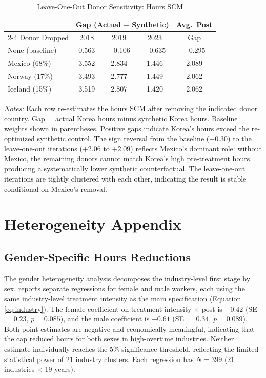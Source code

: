 \documentclass[12pt]{article}
\begin{document}
\begin{table}[H]
\centering
\caption{Leave-One-Out Donor Sensitivity: Hours SCM}
\label{tab:loo_donors}
\begin{tabular}{lcccc}
\toprule
 & \multicolumn{3}{c}{Gap (Actual $-$ Synthetic)} & Avg.\ Post \\
\cmidrule(lr){2-4}
Donor Dropped & 2018 & 2019 & 2023 & Gap \\
\midrule
None (baseline) & 0.563 & $-$0.106 & $-$0.635 & $-$0.295 \\
Mexico (68\%) & 3.552 & 2.834 & 1.446 & 2.089 \\
Norway (17\%) & 3.493 & 2.777 & 1.449 & 2.062 \\
Iceland (15\%) & 3.519 & 2.807 & 1.420 & 2.062 \\
\bottomrule
\end{tabular}
\begin{minipage}{0.95\textwidth}
\footnotesize\textit{Notes:} Each row re-estimates the hours SCM after removing the indicated donor country. Gap = actual Korea hours minus synthetic Korea hours. Baseline weights shown in parentheses. Positive gaps indicate Korea's hours exceed the re-optimized synthetic control. The sign reversal from the baseline ($-0.30$) to the leave-one-out iterations ($+2.06$ to $+2.09$) reflects Mexico's dominant role: without Mexico, the remaining donors cannot match Korea's high pre-treatment hours, producing a systematically lower synthetic counterfactual. The leave-one-out iterations are tightly clustered with each other, indicating the result is stable conditional on Mexico's removal.
\end{minipage}
\end{table}

\section{Heterogeneity Appendix}
\label{sec:het_appendix}

\subsection{Gender-Specific Hours Reductions}

The gender heterogeneity analysis decomposes the industry-level first stage by sex.  reports separate regressions for female and male workers, each using the same industry-level treatment intensity as the main specification (Equation \ref{eq:industry}). The female coefficient on treatment intensity $\times$ post is $-0.42$ (SE $= 0.23$, $p = 0.085$), and the male coefficient is $-0.61$ (SE $= 0.34$, $p = 0.089$). Both point estimates are negative and economically meaningful, indicating that the cap reduced hours for both sexes in high-overtime industries. Neither estimate individually reaches the 5\% significance threshold, reflecting the limited statistical power of 21 industry clusters. Each regression has $N = 399$ (21 industries $\times$ 19 years).
\end{document}
